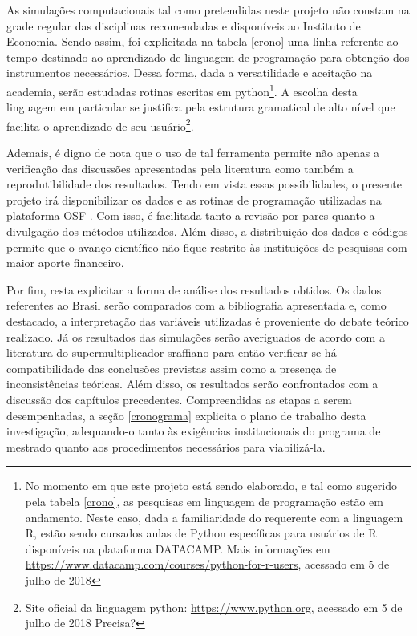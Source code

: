 As simulações computacionais tal como pretendidas neste projeto não constam na grade regular das disciplinas recomendadas e disponíveis ao Instituto de Economia. Sendo assim, foi explicitada na tabela \ref{crono} uma linha referente ao tempo destinado ao aprendizado de linguagem de programação para obtenção dos instrumentos necessários. Dessa forma, dada a versatilidade e aceitação na academia, serão estudadas rotinas escritas em python\footnote{No momento em que este projeto está sendo elaborado, e tal como sugerido pela tabela \ref{crono}, as pesquisas em linguagem de programação estão em andamento. Neste caso, dada a familiaridade do requerente com a linguagem R, estão sendo cursados aulas de Python específicas para usuários de R disponíveis na plataforma DATACAMP. Mais informações em \url{https://www.datacamp.com/courses/python-for-r-users}, acessado em 5 de julho de 2018}. A escolha desta linguagem em particular se justifica pela estrutura gramatical de alto nível que facilita o aprendizado de seu usuário\footnote{Site oficial da linguagem python: \url{https://www.python.org}, acessado em 5 de julho de 2018 {\color{blue} Precisa?}}.

Ademais, é digno de nota que o uso de tal ferramenta permite não apenas a verificação das discussões apresentadas pela literatura como também a reprodutibilidade dos resultados. Tendo em vista essas possibilidades, o presente projeto irá disponibilizar os dados e as rotinas de programação utilizadas na plataforma OSF \cite{center_for_open_science_osfhome_nodate}. Com isso, é facilitada tanto a revisão por pares quanto a divulgação dos métodos utilizados. Além disso, a distribuição dos dados e códigos permite que o avanço científico não fique restrito às instituições de pesquisas com maior aporte financeiro. 



Por fim, resta explicitar a forma de análise dos resultados obtidos. Os dados referentes ao Brasil serão comparados com a bibliografia apresentada e, como destacado, a interpretação das variáveis utilizadas é proveniente do debate teórico realizado. Já os resultados das simulações serão averiguados de acordo com a literatura do supermultiplicador sraffiano para então verificar se há compatibilidade das conclusões previstas assim como a presença de inconsistências teóricas. Além disso, os resultados serão confrontados com a discussão dos capítulos precedentes.
Compreendidas as etapas a serem desempenhadas, a seção \ref{cronograma} explicita o plano de trabalho desta investigação, adequando-o tanto às exigências institucionais do programa de mestrado quanto aos procedimentos necessários para viabilizá-la.


